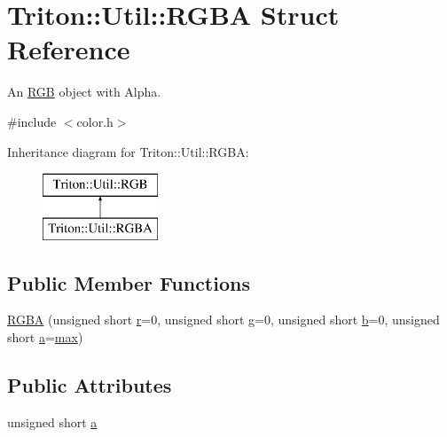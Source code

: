 \hypertarget{struct_triton_1_1_util_1_1_r_g_b_a}{}\section{Triton\+:\+:Util\+:\+:R\+G\+B\+A Struct Reference}
\label{struct_triton_1_1_util_1_1_r_g_b_a}


An \hyperlink{struct_triton_1_1_util_1_1_r_g_b}{R\+G\+B} object with Alpha.  




{\ttfamily \#include $<$color.\+h$>$}

Inheritance diagram for Triton\+:\+:Util\+:\+:R\+G\+B\+A\+:\begin{figure}[H]
\begin{center}
\leavevmode
\includegraphics[height=2.000000cm]{struct_triton_1_1_util_1_1_r_g_b_a}
\end{center}
\end{figure}
\subsection*{Public Member Functions}
\begin{DoxyCompactItemize}
\item 
\hyperlink{group__lus__color_gad6fd5c4030e3b57842ca2b371e460e78}{R\+G\+B\+A} (unsigned short \hyperlink{group__lus__color_ga1fcfba2ad564a76d12f72f4b7441b3dc}{r}=0, unsigned short \hyperlink{group__lus__color_ga595248e981b342dfdeb08dc85f190229}{g}=0, unsigned short \hyperlink{group__lus__color_gadac238b0db4b4534cfa592331234b403}{b}=0, unsigned short \hyperlink{group__lus__color_ga91997be3ade022a459176810c8d2b777}{a}=\hyperlink{group__lus__color_ga25c01b9de0c18136b41333c426c2b226}{max})
\end{DoxyCompactItemize}
\subsection*{Public Attributes}
\begin{DoxyCompactItemize}
\item 
unsigned short \hyperlink{group__lus__color_ga91997be3ade022a459176810c8d2b777}{a}
\end{DoxyCompactItemize}


